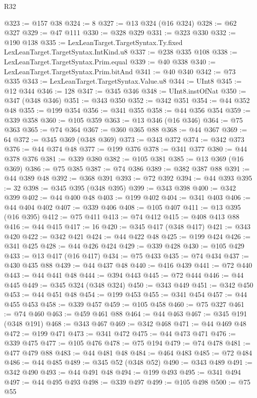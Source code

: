 \begin{lexlean}{R32}
\begin{coremodule}
@323 := @157 @38
@324 := 8
@327 := @13 @324 (@16 @324)
@328 := @62 @327
@329 := @47 @111
@330 := @328 @329
@331 := @323 @330
@332 := @190 @138
@335 := LexLeanTarget.TargetSyntax.Ty.fixed LexLeanTarget.TargetSyntax.IntKind.u8
@337 := @238 @335 @108
@338 := LexLeanTarget.TargetSyntax.Prim.equal
@339 := @40 @338
@340 := LexLeanTarget.TargetSyntax.Prim.bitAnd
@341 := @40 @340
@342 := @73 @335
@343 := LexLeanTarget.TargetSyntax.Value.u8
@344 := UInt8
@345 := @12 @344
@346 := 128
@347 := @345 @346
@348 := UInt8.instOfNat
@350 := @347 (@348 @346)
@351 := @343 @350
@352 := @342 @351
@354 := @44 @352 @48
@355 := @199 @354
@356 := @341 @355
@358 := @44 @356 @354
@359 := @339 @358
@360 := @105 @359
@363 := @13 @346 (@16 @346)
@364 := @75 @363
@365 := @74 @364
@367 := @360 @365 @88
@368 := @44 @367
@369 := 64
@372 := @345 @369 (@348 @369)
@373 := @343 @372
@374 := @342 @373
@376 := @44 @374 @48
@377 := @199 @376
@378 := @341 @377
@380 := @44 @378 @376
@381 := @339 @380
@382 := @105 @381
@385 := @13 @369 (@16 @369)
@386 := @75 @385
@387 := @74 @386
@389 := @382 @387 @88
@391 := @44 @389 @48
@392 := @368 @391
@393 := @72 @392
@394 := @44 @393
@395 := 32
@398 := @345 @395 (@348 @395)
@399 := @343 @398
@400 := @342 @399
@402 := @44 @400 @48
@403 := @199 @402
@404 := @341 @403
@406 := @44 @404 @402
@407 := @339 @406
@408 := @105 @407
@411 := @13 @395 (@16 @395)
@412 := @75 @411
@413 := @74 @412
@415 := @408 @413 @88
@416 := @44 @415
@417 := 16
@420 := @345 @417 (@348 @417)
@421 := @343 @420
@422 := @342 @421
@424 := @44 @422 @48
@425 := @199 @424
@426 := @341 @425
@428 := @44 @426 @424
@429 := @339 @428
@430 := @105 @429
@433 := @13 @417 (@16 @417)
@434 := @75 @433
@435 := @74 @434
@437 := @430 @435 @88
@439 := @44 @437 @48
@440 := @416 @439
@441 := @72 @440
@443 := @44 @441 @48
@444 := @394 @443
@445 := @72 @444
@446 := @44 @445
@449 := @345 @324 (@348 @324)
@450 := @343 @449
@451 := @342 @450
@453 := @44 @451 @48
@454 := @199 @453
@455 := @341 @454
@457 := @44 @455 @453
@458 := @339 @457
@459 := @105 @458
@460 := @75 @327
@461 := @74 @460
@463 := @459 @461 @88
@464 := @44 @463
@467 := @345 @191 (@348 @191)
@468 := @343 @467
@469 := @342 @468
@471 := @44 @469 @48
@472 := @199 @471
@473 := @341 @472
@475 := @44 @473 @471
@476 := @339 @475
@477 := @105 @476
@478 := @75 @194
@479 := @74 @478
@481 := @477 @479 @88
@483 := @44 @481 @48
@484 := @464 @483
@485 := @72 @484
@486 := @44 @485
@489 := @345 @52 (@348 @52)
@490 := @343 @489
@491 := @342 @490
@493 := @44 @491 @48
@494 := @199 @493
@495 := @341 @494
@497 := @44 @495 @493
@498 := @339 @497
@499 := @105 @498
@500 := @75 @55

\end{coremodule}
\end{lexlean}

